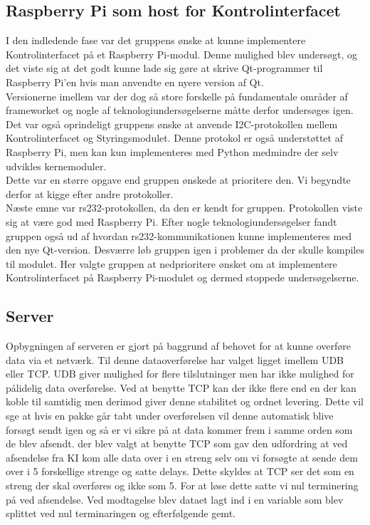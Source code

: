 
\subsection{Raspberry Pi som host for Kontrolinterfacet}
I den indledende fase var det gruppens ønske at kunne implementere Kontrolinterfacet på et Raspberry Pi-modul. Denne mulighed blev undersøgt, og det viste sig at det godt kunne lade sig gøre at skrive Qt-programmer til Raspberry Pi'en hvis man anvendte en nyere version af Qt.\\
Versionerne imellem var der dog så store forskelle på fundamentale områder af frameworket og nogle af teknologiundersøgelserne måtte derfor undersøges igen.\\
Det var også oprindeligt gruppens ønske at anvende I2C-protokollen mellem Kontrolinterfacet og Styringsmodulet. Denne protokol er også understøttet af Raspberry Pi, men kan kun implementeres med Python medmindre der selv udvikles kernemoduler.\\
Dette var en større opgave end gruppen ønskede at prioritere den. Vi begyndte derfor at kigge efter andre protokoller.\\
Næste emne var rs232-protokollen, da den er kendt for gruppen. Protokollen viste sig at være god med Raspberry Pi. Efter nogle teknologiundersøgelser fandt gruppen også ud af hvordan rs232-kommunikationen kunne implementeres med den nye Qt-version.
Desværre løb gruppen igen i problemer da der skulle kompiles til modulet. Her valgte gruppen at nedprioritere ønsket om at implementere Kontrolinterfacet på Raspberry Pi-modulet og dermed stoppede undersøgelserne.

\subsection{Server}
Opbygningen af serveren er gjort på baggrund af behovet for at kunne overføre data via et netværk. Til denne dataoverførelse har valget ligget imellem UDB eller TCP. UDB giver mulighed for flere tilslutninger men har ikke mulighed for pålidelig data overførelse. Ved at benytte TCP kan der ikke flere end en der kan koble til samtidig men derimod giver denne stabilitet og ordnet levering. Dette vil sge at hvis en pakke går tabt under overførelsen vil denne automatisk blive forsøgt sendt igen og så er vi sikre på at data kommer frem i samme orden som de blev afsendt. 
der blev valgt at benytte TCP som gav den udfordring at ved afsendelse fra KI kom alle data over i en streng selv om vi forsøgte at sende dem over i 5 forskellige strenge og satte delays. Dette skyldes at TCP ser det som en streng der skal overføres og ikke som 5. For at løse dette satte vi nul terminering på ved afsendelse. Ved modtagelse blev dataet lagt ind i en variable som blev splittet ved nul terminaringen og efterfølgende gemt.

